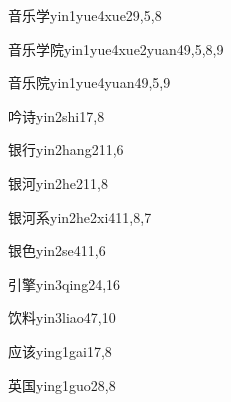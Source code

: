\begin{entry}{音乐学}{yin1yue4xue2}{9,5,8}
\end{entry}

\begin{entry}{音乐学院}{yin1yue4xue2yuan4}{9,5,8,9}
\end{entry}

\begin{entry}{音乐院}{yin1yue4yuan4}{9,5,9}
\end{entry}

\begin{entry}{吟诗}{yin2shi1}{7,8}
\end{entry}

\begin{entry}{银行}{yin2hang2}{11,6}
\end{entry}

\begin{entry}{银河}{yin2he2}{11,8}
\end{entry}

\begin{entry}{银河系}{yin2he2xi4}{11,8,7}
\end{entry}

\begin{entry}{银色}{yin2se4}{11,6}
\end{entry}

\begin{entry}{引擎}{yin3qing2}{4,16}
\end{entry}

\begin{entry}{饮料}{yin3liao4}{7,10}
\end{entry}

\begin{entry}{应该}{ying1gai1}{7,8}
\end{entry}

\begin{entry}{英国}{ying1guo2}{8,8}
\end{entry}

